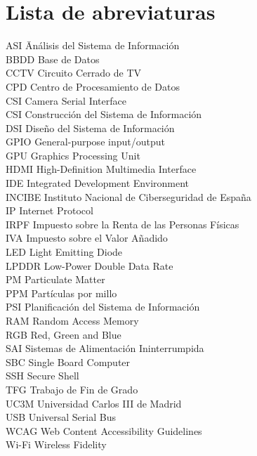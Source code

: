 \newpage %
\thispagestyle{empty}
\mbox{}

\chapter*{Lista de abreviaturas}
\begin{tabbing}  %
	ASI \quad\quad\quad\= Análisis del Sistema de Información \\
	BBDD \> Base de Datos \\
	CCTV \> Circuito Cerrado de TV \\
	CPD \>  Centro de Procesamiento de Datos \\
	CSI \> Camera Serial Interface \\
	CSI \> Construcción del Sistema de Información \\
	DSI \> Diseño del Sistema de Información \\
	GPIO \> General-purpose input/output \\
	GPU \> Graphics Processing Unit \\
	HDMI \> High-Definition Multimedia Interface \\
	IDE \> Integrated Development Environment \\
	INCIBE \> Instituto Nacional de Ciberseguridad de España \\
	IP \> Internet Protocol \\
	IRPF \> Impuesto sobre la Renta de las Personas Físicas \\
	IVA \>  Impuesto sobre el Valor Añadido \\
	LED \> Light Emitting Diode \\
	LPDDR \> Low-Power Double Data Rate \\
	PM \> Particulate Matter \\
	PPM \> Partículas por millo \\
	PSI \> Planificación del Sistema de Información \\
	RAM \> Random Access Memory \\
	RGB \> Red, Green and Blue \\
	SAI \> Sistemas de Alimentación Ininterrumpida \\
	SBC \> Single Board Computer \\
	SSH \> Secure Shell \\
	TFG \>  Trabajo de Fin de Grado \\
	UC3M  \>  Universidad Carlos III de Madrid \\
	USB \> Universal Serial Bus \\
	WCAG \> Web Content Accessibility Guidelines \\
	Wi-Fi \> Wireless Fidelity
\end{tabbing}